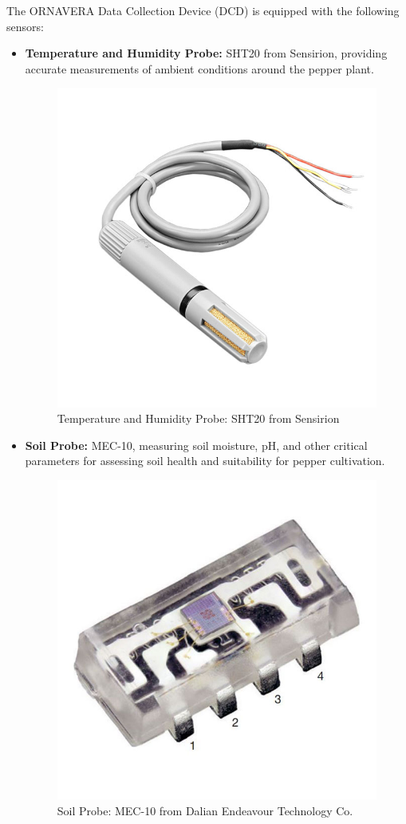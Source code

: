 The ORNAVERA Data Collection Device (DCD) is equipped with the following sensors:
\begin{itemize}
    \item \textbf{Temperature and Humidity Probe:} SHT20 from Sensirion, providing accurate measurements of ambient conditions around the pepper plant.
    \begin{figure}[htbp]
        \centering
        \includegraphics[width=6 cm]{4_ChapterMaterials/figuras/SHT20.jpg}
        \caption{Temperature and Humidity Probe: SHT20 from Sensirion\cite{ornavera2020dcd}}
        \end{figure}

    \item \textbf{Soil Probe:} MEC-10, measuring soil moisture, pH, and other critical parameters for assessing soil health and suitability for pepper cultivation.
    \begin{figure}[htbp]
        \centering
        \includegraphics[width=6 cm]{4_ChapterMaterials/figuras/VEML7700.jpeg}
        \caption{Soil Probe: MEC-10 from Dalian Endeavour Technology Co. \cite{ornavera2020dcd}}
        \end{figure}


\end{itemize}
